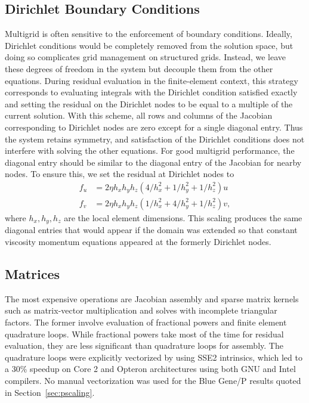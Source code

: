\subsection{Dirichlet Boundary Conditions}\label{ssec:dirichlet}
Multigrid is often sensitive to the enforcement of boundary conditions.  Ideally, Dirichlet
conditions would be completely removed from the solution space, but doing so complicates grid
management on structured grids.
Instead, we leave these degrees of freedom in the system but
decouple them from the other equations.  During residual evaluation in the finite-element context,
this strategy corresponds to evaluating integrals with the Dirichlet condition satisfied exactly and setting
the residual on the Dirichlet nodes to be equal to a multiple of the current solution.  With this
scheme, all rows and columns of the Jacobian corresponding to Dirichlet nodes are zero except for a
single diagonal entry. Thus the system retains symmetry, and satisfaction of the Dirichlet conditions
does not interfere with solving the other equations.  For good multigrid performance, the diagonal
entry should be similar to the diagonal entry of the Jacobian for nearby nodes.  To ensure this, we
set the residual at Dirichlet nodes to
\begin{equation}\label{eq:dirichlet-scale}
  \begin{split}
    f_u &= 2 \eta h_xh_yh_z (4/h_x^2 + 1/h_y^2 + 1/h_z^2) u \\
    f_v &= 2 \eta h_xh_yh_z (1/h_x^2 + 4/h_y^2 + 1/h_z^2) v,
  \end{split}
\end{equation}
where $h_x,h_y,h_z$ are the local element dimensions.  This scaling produces the same diagonal
entries that would appear if the domain was extended so that constant viscosity momentum equations
appeared at the formerly Dirichlet nodes.

\subsection{Matrices}
The most expensive operations are Jacobian assembly and sparse matrix kernels such as matrix-vector multiplication and solves with incomplete triangular factors.
The former involve evaluation of fractional powers and finite element quadrature loops.  While fractional powers take most of the time for residual evaluation, they are less significant than quadrature loops for assembly.  The quadrature loops were explicitly vectorized by using SSE2 intrinsics, which led to a 30\% speedup on Core 2 and Opteron architectures using both GNU and Intel compilers.
No manual vectorization was used for the Blue Gene/P results quoted in Section~\ref{sec:pscaling}.


